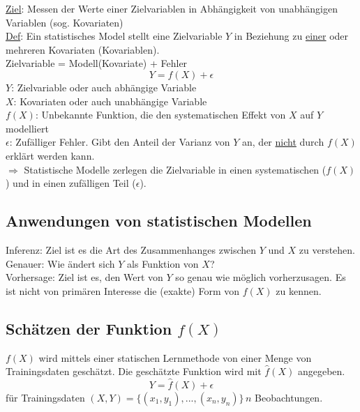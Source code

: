 \underline{Ziel}: Messen der Werte einer Zielvariablen in Abhängigkeit von unabhängigen Variablen (sog. Kovariaten) \\
\underline{Def}: Ein statistisches Model stellt eine Zielvariable $Y$ in Beziehung zu \underline{einer} oder mehreren Kovariaten (Kovariablen). \\
Zielvariable = Modell(Kovariate) + Fehler \\
\[ Y = f(X) + \epsilon \]
$Y$: Zielvariable oder auch abhängige Variable \\
$X$: Kovariaten oder auch unabhängige Variable \\
$f(X)$: Unbekannte Funktion, die den systematischen Effekt von $X$ auf $Y$ modelliert \\
$\epsilon$: Zufälliger Fehler. Gibt den Anteil der Varianz von $Y$ an, der \underline{nicht} durch $f(X)$ erklärt werden kann. \\
$\Rightarrow$ Statistische Modelle zerlegen die Zielvariable in einen systematischen ($f(X)$) und in einen zufälligen Teil ($\epsilon$). \\

\subsection{Anwendungen von statistischen Modellen}
Inferenz: Ziel ist es die Art des Zusammenhanges zwischen $Y$ und $X$ zu verstehen. Genauer: Wie ändert sich $Y$ als Funktion von $X$?\\
Vorhersage: Ziel ist es, den Wert von $Y$ so genau wie möglich vorherzusagen. Es ist nicht von primären Interesse die (exakte) Form von $f(X)$ zu kennen. \\

\subsection{Schätzen der Funktion $f(X)$}
$f(X)$ wird mittels einer statischen Lernmethode von einer Menge von Trainingsdaten geschätzt. Die geschätzte Funktion wird mit $\hat{f}(X)$ angegeben.
\[ Y = \hat{f}(X) + \epsilon \]
für Trainingsdaten $(X,Y) = \{(x_1,y_1),...,(x_n,y_n)\}\, n$ Beobachtungen.


